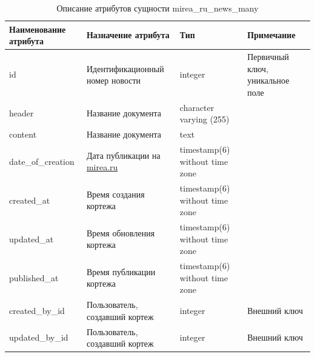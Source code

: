 \documentclass{mirea}
\begin{document}
	\begin{longtable}{ |p{}|p{}|p{}|p{}| } 
		\caption{Описание атрибутов сущности mirea\_ru\_news\_many}
		\endfirsthead
		\endhead
		\hline
		Наименование атрибута & Назначение атрибута & Тип & Примечание \\ \hline
		
		id & Идентификацион\-ный номер новости & integer & Первичный ключ, уникальное поле \\ \hline
		
		header & Название документа & character varying (255) & \\ \hline
		
		content & Название документа & text & \\ \hline
		
		date\_of\_creation & Дата публикации на \url{mirea.ru} & timestamp(6) without time zone & \\ \hline
		
		created\_at & Время создания кортежа & timestamp(6) without time zone & \\ \hline
		
		updated\_at & Время обновления кортежа & timestamp(6) without time zone & \\ \hline
		
		published\_at & Время публикации кортежа & timestamp(6) without time zone & \\ \hline
		
		created\_by\_id & Пользователь, создавший кортеж & integer & Внешний ключ \\ \hline
		
		updated\_by\_id & Пользователь, создавший кортеж & integer & Внешний ключ \\ \hline
		
	\end{longtable}
\end{document}
